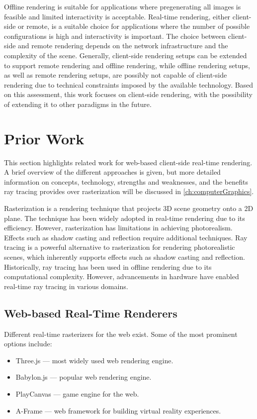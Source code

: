 Offline rendering is suitable for applications where pregenerating all images is feasible and limited interactivity is acceptable. Real-time rendering, either client-side or remote, is a suitable choice for applications where the number of possible configurations is high and interactivity is important. The choice between client-side and remote rendering depends on the network infrastructure and the complexity of the scene.
Generally, client-side rendering setups can be extended to support remote rendering and offline rendering, while offline rendering setups, as well as remote rendering setups, are possibly not capable of client-side rendering due to technical constraints imposed by the available technology. Based on this assessment, this work focuses on client-side rendering, with the possibility of extending it to other paradigms in the future.

\section{Prior Work}

This section highlights related work for web-based client-side real-time rendering. A brief overview of the different approaches is given, but more detailed information on concepts, technology, strengths and weaknesses, and the benefits ray tracing provides over rasterization will be discussed in \autoref{ch:computerGraphics}.

Rasterization is a rendering technique that projects 3D scene geometry onto a 2D plane. The technique has been widely adopted in real-time rendering due to its efficiency. However, rasterization has limitations in achieving photorealism. Effects such as shadow casting and reflection require additional techniques. Ray tracing is a powerful alternative to rasterization for rendering photorealistic scenes, which inherently supports effects such as shadow casting and reflection. Historically, ray tracing has been used in offline rendering due to its computational complexity. However, advancements in hardware have enabled real-time ray tracing in various domains.

\subsection*{Web-based Real-Time Renderers}

Different real-time rasterizers for the web exist. Some of the most prominent options include:

\begin{itemize}
  \item {\gls{Three.js}} \cite{threeJSWebsite} — most widely used web rendering engine.
  \item {\gls{Babylon.js}} \cite{babylonJSWebsite} — popular web rendering engine.
  \item {\gls{PlayCanvas}} \cite{playCanvasWebsite} — game engine for the web.
  \item {\gls{A-Frame}} \cite{aFrameWebsite} — web framework for building virtual reality experiences.
\end{itemize}


